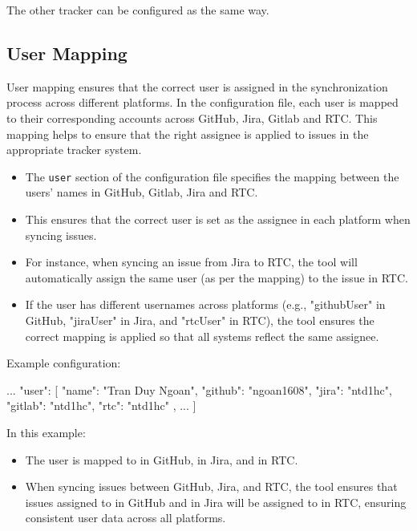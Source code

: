 The other tracker can be configured as the same way.

\subsection{User Mapping}
User mapping ensures that the correct user is assigned in the synchronization
process across different platforms.
In the configuration file, each user is mapped to their corresponding accounts
across GitHub, Jira, Gitlab and RTC. This mapping helps to ensure that the right
assignee is applied to issues in the appropriate tracker system.

\begin{itemize}
   \item The \texttt{user} section of the configuration file specifies the
         mapping between the users' names in GitHub, Gitlab, Jira and RTC.
   \item This ensures that the correct user is set as the assignee in each
         platform when syncing issues.
   \item For instance, when syncing an issue from Jira to RTC, the tool will
         automatically assign the same user (as per the mapping) to the issue in RTC.
   \item If the user has different usernames across platforms
         (e.g., "githubUser" in GitHub, "jiraUser" in Jira, and "rtcUser" in RTC),
         the tool ensures the correct mapping is applied so that all systems
         reflect the same assignee.
\end{itemize}

Example configuration:
\begin{pythoncode}
{
   ...
   "user": [
      {
         "name": "Tran Duy Ngoan",
         "github": "ngoan1608",
         "jira": "ntd1hc",
         "gitlab": "ntd1hc",
         "rtc": "ntd1hc"
      },
      ...
   ]
}
\end{pythoncode}

In this example:
\begin{itemize}
    \item The user  is mapped to  in
          GitHub,  in Jira, and  in RTC.
    \item When syncing issues between GitHub, Jira, and RTC, the tool ensures
          that issues assigned to  in GitHub and
           in Jira will be assigned to  in RTC,
          ensuring consistent user data across all platforms.
\end{itemize}


